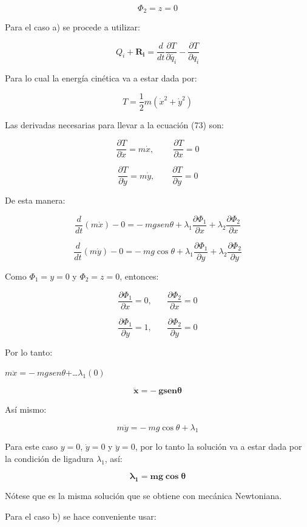 \documentclass[]{article}
\begin{document}
\[\Phi_{2} = z = 0\]

Para el caso a) se procede a utilizar:

\[Q_{i} + \mathbf{R}_{\mathbf{i}} = \frac{d}{dt}\frac{\partial T}{\partial\dot{q_{i}}} - \frac{\partial T}{\partial q_{i}}\]

Para lo cual la energía cinética va a estar dada por:

\[T = \frac{1}{2}m\left( {\dot{x}}^{2} + {\dot{y}}^{2} \right)\]

Las derivadas necesarias para llevar a la ecuación (73) son:

\[\frac{\partial T}{\partial\dot{x}} = m\dot{x},\ \ \ \ \ \ \ \ \ \ \frac{\partial T}{\partial x} = 0\]

\[\frac{\partial T}{\partial\dot{y}} = m\dot{y},\ \ \ \ \ \ \ \ \ \frac{\partial T}{\partial y} = 0\]

De esta manera:

\[\frac{d}{dt}\left( m\dot{x} \right) - 0 = - \ mg{sen}\theta + \lambda_{1}\frac{\partial\Phi_{1}}{\partial x} + \lambda_{2}\frac{\partial\Phi_{2}}{\partial x}\]

\[\frac{d}{dt}\left( m\dot{y} \right) - 0 = - \ mg\cos\theta + \lambda_{1}\frac{\partial\Phi_{1}}{\partial y} + \lambda_{2}\frac{\partial\Phi_{2}}{\partial y}\]

Como \(\Phi_{1} = y = 0\) y \(\Phi_{2} = z = 0\), entonces:

\[\frac{\partial\Phi_{1}}{\partial x} = 0,\ \ \ \ \ \ \ \ \frac{\partial\Phi_{2}}{\partial x} = 0\]

\[\frac{\partial\Phi_{1}}{\partial y} = 1,\ \ \ \ \ \ \ \ \frac{\partial\Phi_{2}}{\partial y} = 0\]

Por lo tanto:

\(m\ddot{x} = - \ mg{sen}\theta\)+\ldots{}\(\lambda_{1}(0)\)

\[\ddot{\mathbf{x}}\mathbf{= - \ g}\mathbf{sen}\mathbf{\theta}\]

Así mismo:

\[m\ddot{y} = - \ mg\cos\theta + \lambda_{1}\]

Para este caso \(y = 0\), \(\dot{y} = 0\) y \(\ddot{y} = 0\), por lo
tanto la solución va a estar dada por la condición de ligadura
\(\lambda_{1}\), así:

\[\mathbf{\lambda}_{\mathbf{1}}\mathbf{= mg}\mathbf{\cos}\mathbf{\theta}\]

Nótese que es la misma solución que se obtiene con mecánica Newtoniana.

Para el caso b) se hace conveniente usar:
\end{document}
